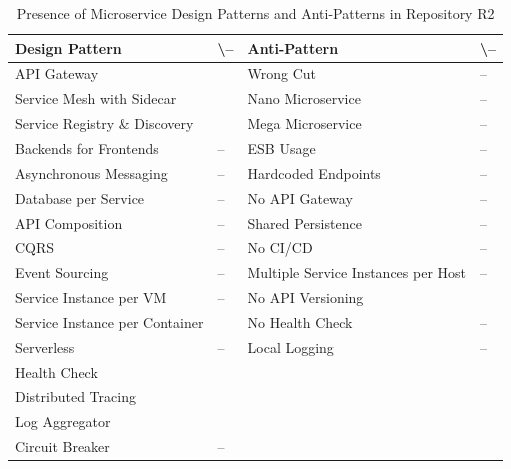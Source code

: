 \documentclass{Configuration_Files/PoliMi3i_thesis}
\newcommand{\cmark}{\ding{51}}%
\begin{document}
\begin{table}[H]
\centering 
    \begin{tabular}{ 
  | >{\centering\arraybackslash} m{16em} 
  | >{\centering\arraybackslash} m{2.2em} 
  | >{\centering\arraybackslash} m{16em} 
  | >{\centering\arraybackslash} m{2.2em} | }
    \hline
    \rowcolor{bluepoli!40}
    \textbf{Design Pattern} & \cmark \textbackslash – & \textbf{Anti-Pattern} & \cmark \textbackslash – \T\B \\
    \hline \hline
    API Gateway & \cmark & Wrong Cut & – \T\B\\
    \hline
    \rowcolor{bluepoli!10}
    Service Mesh with Sidecar & \cmark & Nano Microservice & – \T\B \\
    \hline
    Service Registry \& Discovery & \cmark & Mega Microservice & – \T\B \\
    \hline
    \rowcolor{bluepoli!10}
    Backends for Frontends & – & ESB Usage & – \T\B \\
    \hline
    Asynchronous Messaging & – & Hardcoded Endpoints & – \T\B \\
    \hline
    \rowcolor{bluepoli!10}
    Database per Service & – & No API Gateway & – \T\B \\
    \hline
    API Composition & – & Shared Persistence & – \T\B \\
    \hline
    \rowcolor{bluepoli!10}
    CQRS & – & No CI/CD & – \T\B \\
    \hline
    Event Sourcing & – & Multiple Service Instances per Host & – \T\B \\
    \hline
    \rowcolor{bluepoli!10}
    Service Instance per VM & – & No API Versioning & \cmark \T\B \\
    \hline
    Service Instance per Container & \cmark & No Health Check & – \T\B \\
    \hline
    \rowcolor{bluepoli!10}
    Serverless & – & Local Logging & – \T\B \\
    \hline
    Health Check & \cmark &  & \T\B \\
    \hline
    \rowcolor{bluepoli!10}
    Distributed Tracing & \cmark & & \T\B \\
    \hline
    Log Aggregator & \cmark &  & \T\B \\
    \hline
    \rowcolor{bluepoli!10}
    Circuit Breaker & – &  & \T\B \\
    \hline
    \end{tabular}
    \\[10pt]
    \caption{Presence of Microservice Design Patterns and Anti-Patterns in Repository R2}
    \label{table:R2_result}
\end{table}
\end{document}
